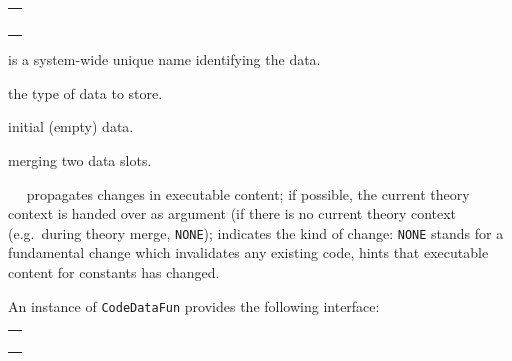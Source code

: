 \begin{isabellebody}
\begin{isamarkuptext}
  \medskip
  \begin{tabular}{l}
  \isa{val\ name{\isacharcolon}\ string} \\
  \isa{type\ T} \\
  \isa{val\ empty{\isacharcolon}\ T} \\
  \isa{val\ merge{\isacharcolon}\ Pretty{\isachardot}pp\ {\isasymrightarrow}\ T\ {\isacharasterisk}\ T\ {\isasymrightarrow}\ T} \\
  \isa{val\ purge{\isacharcolon}\ theory\ option\ {\isasymrightarrow}\ CodegenConsts{\isachardot}const\ list\ option\ {\isasymrightarrow}\ T\ {\isasymrightarrow}\ T}
  \end{tabular}

  \begin{description}

  \item {} is a system-wide unique name identifying the data.

  \item {} the type of data to store.

  \item {} initial (empty) data.

  \item {} merging two data slots.

  \item {}~~ propagates changes in executable content;
    if possible, the current theory context is handed over
    as argument  (if there is no current theory context (e.g.~during
    theory merge, \verb|NONE|);  indicates the kind
    of change: \verb|NONE| stands for a fundamental change
    which invalidates any existing code, 
    hints that executable content for constants 
    has changed.

  \end{description}

  An instance of \verb|CodeDataFun| provides the following
  interface:

  \medskip
  \begin{tabular}{l}
  \isa{init{\isacharcolon}\ theory\ {\isasymrightarrow}\ theory} \\
  \isa{get{\isacharcolon}\ theory\ {\isasymrightarrow}\ T} \\
  \isa{change{\isacharcolon}\ theory\ {\isasymrightarrow}\ {\isacharparenleft}T\ {\isasymrightarrow}\ T{\isacharparenright}\ {\isasymrightarrow}\ T} \\
  \isa{change{\isacharunderscore}yield{\isacharcolon}\ theory\ {\isasymrightarrow}\ {\isacharparenleft}T\ {\isasymrightarrow}\ {\isacharprime}a\ {\isacharasterisk}\ T{\isacharparenright}\ {\isasymrightarrow}\ {\isacharprime}a\ {\isacharasterisk}\ T}
  \end{tabular}


\end{isamarkuptext}
\end{isabellebody}
